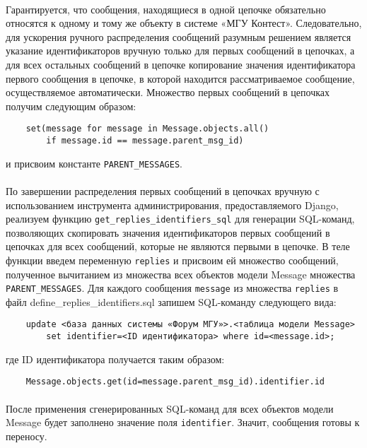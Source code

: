 \documentclass[12pt, a4paper, oneside]{article}
\begin{document}
\paragraph{}
Гарантируется, что сообщения, находящиеся в одной цепочке обязательно относятся к одному и тому же объекту в системе «МГУ Контест». Следовательно, для ускорения ручного распределения сообщений разумным решением является указание идентификаторов вручную только для первых сообщений в цепочках, а для всех остальных сообщений в цепочке копирование значения идентификатора первого сообщения в цепочке, в которой находится рассматриваемое сообщение, осуществляемое автоматически. Множество первых сообщений в цепочках получим следующим образом:
\begin{verbatim}
    set(message for message in Message.objects.all() 
        if message.id == message.parent_msg_id)
\end{verbatim}
и присвоим константе \texttt{PARENT\_MESSAGES}.
\paragraph{}
По завершении распределения первых сообщений в цепочках вручную с использованием инструмента администрирования, предоставляемого Django, реализуем функцию \texttt{get\_replies\_identifiers\_sql} для генерации SQL-команд, позволяющих скопировать значения идентификаторов первых сообщений в цепочках для всех сообщений, которые не являются первыми в цепочке. В теле функции введем переменную \texttt{replies} и присвоим ей множество сообщений, полученное вычитанием из множества всех объектов модели Message множества \texttt{PARENT\_MESSAGES}. Для каждого сообщения \texttt{message} из множества \texttt{replies} в файл define\_replies\_identifiers.sql запишем SQL-команду следующего вида:
\begin{verbatim}
    update <база данных системы «Форум МГУ»>.<таблица модели Message> 
        set identifier=<ID идентификатора> where id=<message.id>;
\end{verbatim}
где ID идентификатора получается таким образом:
\begin{verbatim}
    Message.objects.get(id=message.parent_msg_id).identifier.id
\end{verbatim}
\paragraph{}
После применения сгенерированных SQL-команд для всех объектов модели Message будет заполнено значение поля \texttt{identifier}. Значит, сообщения готовы к переносу.
\vspace{1cm}
\end{document}

